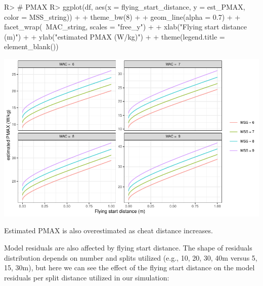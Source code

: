 \documentclass[
]{jss}
\begin{document}
\begin{CodeChunk}
\begin{CodeInput}
R> # PMAX
R> ggplot(df, aes(x = flying_start_distance, y = est_PMAX, color = MSS_string)) +
+   theme_bw(8) +
+   geom_line(alpha = 0.7) +
+   facet_wrap(~MAC_string, scales = "free_y") +
+   xlab("Flying start distance (m)") +
+   ylab("estimated PMAX (W/kg)") +
+   theme(legend.title = element_blank())
\end{CodeInput}


\begin{center}\includegraphics[width=1\linewidth]{paper_files/figure-latex/unnamed-chunk-29-1} \end{center}

\end{CodeChunk}

Estimated PMAX is also overestimated as cheat distance increases.

Model residuals are also affected by flying start distance. The shape of residuals distribution depends on number and splits utilized (e.g., 10, 20, 30, 40m versus 5, 15, 30m), but here we can see the effect of the flying start distance on the model residuals per split distance utilized in our simulation:
\end{document}
